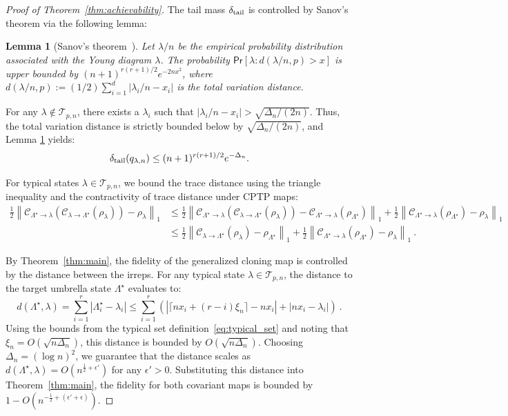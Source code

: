 \documentclass[a4paper,onecolumn,11pt]{quantumarticle}
\newtheorem{lem}{Lemma}
\def\map{\mathcal}
\begin{document}
\begin{proof}[Proof of Theorem~\ref{thm:achievability}]
The tail mass $\delta_{\rm tail}$ is controlled by Sanov's theorem via the following lemma:
\begin{lem}[Sanov's theorem~\cite{yang2016efficient,christandl2006spectra,o2021quantum,hayashi2017group}]\label{lem:tail_prob}
    Let $\lambda/n$ be the empirical probability distribution associated with the Young diagram $\lambda$.
    The probability $\mathsf{Pr}[\lambda:d(\lambda/n,p)>x]$ is upper bounded by $(n+1)^{r(r+1)/2} e^{-2nx^2}$, where $d(\lambda/n,p):= (1/2)\sum_{i=1}^d|\lambda_i/n-x_i|$ is the total variation distance.
\end{lem}
For any $\lambda\not\in\mathcal{T}_{p,n}$, there exists a $\lambda_i$ such that $|\lambda_i/n-x_i|>\sqrt{\Delta_n/(2n)}$. Thus, the total variation distance is strictly bounded below by $\sqrt{\Delta_n/(2n)}$, and Lemma \ref{lem:tail_prob} yields:
\begin{equation}\label{eq:tail_prob_bound}
    \delta_{\rm tail}(q_{\lambda,n})\le (n+1)^{r(r+1)/2} e^{-\Delta_n}.
\end{equation} 

For typical states $\lambda\in\mathcal{T}_{p,n}$, we bound the trace distance using the triangle inequality and the contractivity of trace distance under CPTP maps:
\begin{equation}\label{eq:error_bound1}
\begin{aligned}
    \frac12\left\|\map{C}_{\Lambda^\star\to \lambda}\left(\map{C}_{\lambda\to \Lambda^\star}(\rho_\lambda)\right)-\rho_\lambda\right\|_1 
    &\le \frac12\left\|\map{C}_{\Lambda^\star\to \lambda}\left(\map{C}_{\lambda\to \Lambda^\star}(\rho_\lambda)\right) - \map{C}_{\Lambda^\star\to \lambda}(\rho_{\Lambda^\star})\right\|_1 + \frac12\left\|\map{C}_{\Lambda^\star\to \lambda}(\rho_{\Lambda^\star}) - \rho_\lambda\right\|_1 \\
    &\le \frac12\left\|\map{C}_{\lambda\to \Lambda^\star}(\rho_\lambda) - \rho_{\Lambda^\star}\right\|_1 + \frac12\left\|\map{C}_{\Lambda^\star\to \lambda}(\rho_{\Lambda^\star}) - \rho_\lambda\right\|_1 \ .
\end{aligned}
\end{equation}

By Theorem~\ref{thm:main}, the fidelity of the generalized cloning map is controlled by the distance between the irreps. For any typical state $\lambda \in \mathcal{T}_{p,n}$, the distance to the target umbrella state $\Lambda^\star$ evaluates to:
\begin{equation}
    d(\Lambda^\star, \lambda) = \sum_{i=1}^r |\Lambda^\star_i - \lambda_i| \le \sum_{i=1}^r \left( |\lceil n x_i + (r-i)\xi_n \rceil - n x_i| + |n x_i - \lambda_i| \right) \ .
\end{equation}
Using the bounds from the typical set definition~\eqref{eq:typical_set} and noting that $\xi_n = O(\sqrt{n\Delta_n})$, this distance is bounded by $O(\sqrt{n\Delta_n})$. 
Choosing $\Delta_n = (\log n)^2$, we guarantee that the distance scales as $d(\Lambda^\star, \lambda) = O(n^{\frac{1}{2}+\epsilon'})$ for any $\epsilon' > 0$. Substituting this distance into Theorem~\ref{thm:main}, the fidelity for both covariant maps is bounded by $1 - O(n^{-\frac{1}{2} + (\epsilon'+\epsilon)})$.


\end{proof}
\end{document}
